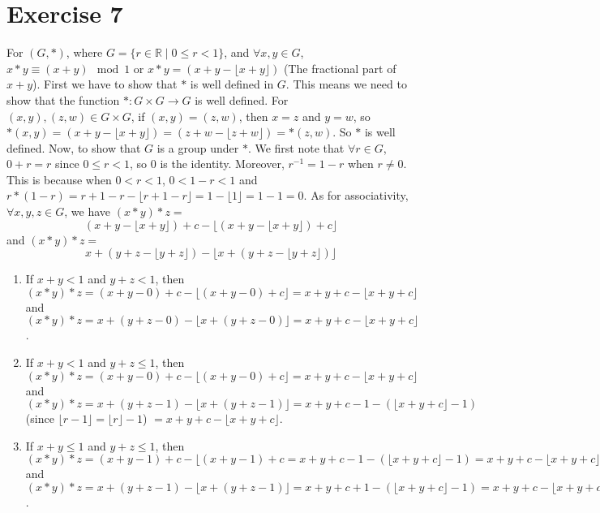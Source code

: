 \documentclass{article}
\newcommand{\R}{\mathbb{R}}
\begin{document}
    \section*{Exercise 7}
    For $(G, \ast)$, where $G = \{r \in \R \mid 0 \leqslant r < 1\}$,
    and $\forall x, y \in G$, 
    $x \ast y \equiv (x + y) \mod{1}$
    or $x \ast y = (x + y - \lfloor x + y \rfloor)$
    (The fractional part of $x + y$).
    First we have to show that $\ast$ is well defined in $G$. 
    This means we need to show that the function $\ast:G \times G \to G$
    is well defined.
    For $(x, y), (z, w) \in G \times G$,
    if $(x, y) = (z, w)$,
    then $x = z$ and $y = w$,
    so $\ast(x, y) 
    = (x + y - \lfloor x + y \rfloor) 
    = (z + w - \lfloor z + w \rfloor) 
    = \ast(z, w)$.
    So $\ast$ is well defined.
    Now, to show that $G$ is a group under $\ast$.
    We first note that $\forall r \in G$, $0 + r = r$
    since $0 \leqslant r < 1$,
    so $0$ is the identity.
    Moreover, $r^{-1} = 1 - r$
    when $r \neq 0$.
    This is because when $0 < r < 1$, $0 < 1 - r < 1$
    and $r \ast (1 - r) 
    = r + 1 - r - \lfloor r + 1 - r \rfloor 
    = 1 - \lfloor 1 \rfloor 
    = 1 - 1 = 0$.
    As for associativity, $\forall x, y, z \in G$,
    we have $(x \ast y) \ast z = $
    \[(x + y - \lfloor x + y \rfloor) + c -
    \lfloor (x + y - \lfloor x + y \rfloor) + c \rfloor\]
    and $(x \ast y) \ast z = $
    \[x + (y + z - \lfloor y + z \rfloor)
    - \lfloor x + (y + z - \lfloor y + z \rfloor) \rfloor\] 
    \begin{enumerate}[label=\textbf{case \arabic*:}]
        \item
            If $x + y < 1$ and $y + z < 1$,
            then $(x \ast y) \ast z 
            = (x + y - 0) + c - \lfloor (x + y - 0) + c \rfloor
            = x + y + c - \lfloor x + y + c \rfloor$
            and $(x \ast y) \ast z 
            = x + (y + z - 0) - \lfloor x + (y + z - 0) \rfloor
            = x + y + c - \lfloor x + y + c \rfloor$.
        \item
            If $x + y < 1$ and $y + z \leqslant 1$,
            then $(x \ast y) \ast z 
            = (x + y - 0) + c - \lfloor (x + y - 0) + c \rfloor
            = x + y + c - \lfloor x + y + c \rfloor$
            and $(x \ast y) \ast z 
            = x + (y + z - 1) - \lfloor x + (y + z - 1) \rfloor
            = x + y + c - 1 - (\lfloor x + y + c \rfloor - 1)$ 
            (since $\lfloor r - 1 \rfloor = \lfloor r \rfloor - 1$)
            $ = x + y + c - \lfloor x + y + c \rfloor$.
        \item
            If $x + y \leqslant 1$ and $y + z \leqslant 1$,
            then $(x \ast y) \ast z
            = (x + y - 1) + c - \lfloor (x + y - 1) + c
            = x + y + c - 1 - (\lfloor x + y + c \rfloor - 1)
            = x + y + c - \lfloor x + y + c \rfloor$
            and $(x \ast y) \ast z
            = x + (y + z - 1) - \lfloor x + (y + z - 1) \rfloor
            = x + y + c + 1 - (\lfloor x + y + c \rfloor - 1)
            = x + y + c - \lfloor x + y + c \rfloor$.
    \end{enumerate}
\end{document}
